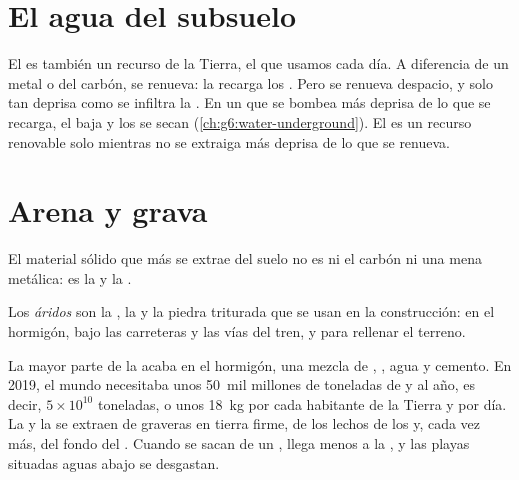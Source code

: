 \section{El agua del subsuelo}

El  es también un recurso de la Tierra, el que usamos
cada día. A diferencia de un metal o del carbón, se renueva: la 
recarga los . Pero se renueva despacio, y solo tan deprisa como
se infiltra la . En un  que se bombea más deprisa de lo que
se recarga, el  baja y los  se secan
(\cref{ch:g6:water-underground}). El  es un recurso
renovable solo mientras no se extraiga más deprisa de lo que se renueva.

\section{Arena y grava}

El material sólido que más se extrae del suelo no es ni el carbón ni una
mena metálica: es la  y la .

\begin{definition}[Áridos]\label{def:g9:earth-resources:aggregate}
Los \emph{áridos} son la , la  y la piedra
triturada que se usan en la construcción: en el hormigón, bajo las
carreteras y las vías del tren, y para rellenar el terreno.
\end{definition}

La mayor parte de la  acaba en el hormigón, una mezcla de ,
, agua y cemento. En 2019, el mundo necesitaba unos 50~mil millones
de toneladas de  y  al año, es decir, $5 \times 10^{10}$
toneladas, o unos \qty{18}{kg} por cada habitante de la Tierra y por día.
La  y la  se extraen de graveras en tierra firme, de los lechos
de los  y, cada vez más, del fondo del . Cuando se sacan de un ,
llega menos  a la , y las playas situadas aguas abajo se
desgastan.

